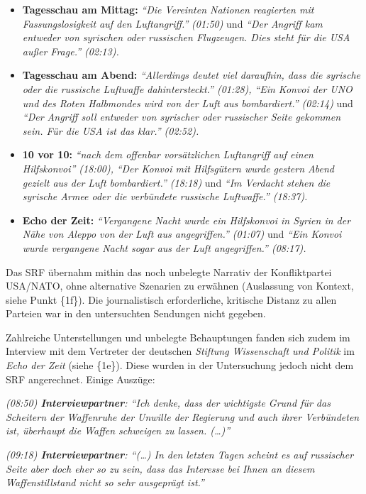 \begin{itemize}
\tightlist
\item
  \textbf{Tagesschau am Mittag:} \emph{``Die Vereinten Nationen
  reagierten mit Fassungslosigkeit auf den Luftangriff.''}
  \emph{(01:50)} und \emph{``Der Angriff kam entweder von syrischen oder
  russischen Flugzeugen. Dies steht für die USA außer Frage.'' (02:13).}
\item
  \textbf{Tagesschau am Abend:} \emph{``Allerdings deutet viel
  daraufhin, dass die syrische oder die russische Luftwaffe
  dahintersteckt.'' (01:28),} \emph{``Ein Konvoi der UNO und des Roten
  Halbmondes wird von der Luft aus bombardiert.'' (02:14)} und
  \emph{``Der Angriff soll entweder von syrischer oder russischer Seite
  gekommen sein. Für die USA ist das klar.'' (02:52).}
\item
  \textbf{10 vor 10:} \emph{``nach dem offenbar vorsätzlichen
  Luftangriff auf einen Hilfskonvoi'' (18:00),} \emph{``Der Konvoi mit
  Hilfsgütern wurde gestern Abend gezielt aus der Luft bombardiert.''
  (18:18)} und \emph{``Im Verdacht stehen die syrische Armee oder die
  verbündete russische Luftwaffe.'' (18:37).}
\item
  \textbf{Echo der Zeit:} \emph{``Vergangene Nacht wurde ein Hilfskonvoi
  in Syrien in der Nähe von Aleppo von der Luft aus angegriffen.''
  (01:07)} und \emph{``Ein Konvoi wurde vergangene Nacht sogar aus der
  Luft angegriffen.'' (08:17).}
\end{itemize}

Das SRF übernahm mithin das noch unbelegte Narrativ der Konfliktpartei
USA/NATO, ohne alternative Szenarien zu erwähnen (Auslassung von
Kontext, siehe Punkt \{1f\}). Die journalistisch erforderliche,
kritische Distanz zu allen Parteien war in den untersuchten Sendungen
nicht gegeben.

Zahlreiche Unterstellungen und unbelegte Behauptungen fanden sich zudem
im Interview mit dem Vertreter der deutschen \emph{Stiftung Wissenschaft
und Politik} im \emph{Echo der Zeit} (siehe \{1e\}). Diese wurden in der
Untersuchung jedoch nicht dem SRF angerechnet. Einige Auszüge:

\emph{(08:50) \textbf{Interviewpartner}: ``Ich denke, dass der
wichtigste Grund für das Scheitern der Waffenruhe der Unwille der
Regierung und auch ihrer Verbündeten ist, überhaupt die Waffen schweigen
zu lassen. (\ldots{})''}

\emph{(09:18) \textbf{Interviewpartner}: ``(\ldots{}) In den letzten
Tagen scheint es auf russischer Seite aber doch eher so zu sein, dass
das Interesse bei Ihnen an diesem Waffenstillstand nicht so sehr
ausgeprägt ist.''}

